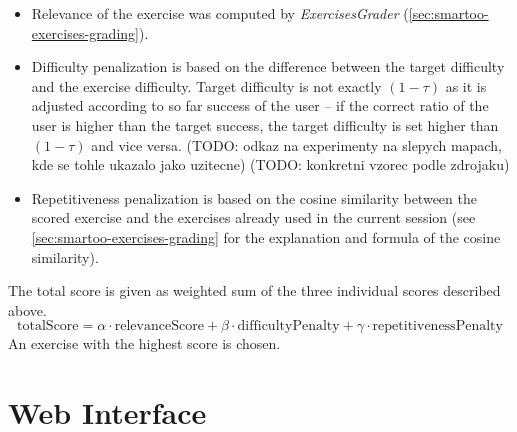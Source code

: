 \documentclass[a4paper, 12pt, twoside]{fithesis2}		%
\renewcommand{\_}{\leavevmode \kern0.07em\vbox{\hrule width0.4em}}
\newcommand{\squarebullet}{\textcolor{black}{\raisebox{0.15em}{\rule{4pt}{4pt}}}}
\newenvironment{myItemize}{
  \begin{itemize}[leftmargin=2em,rightmargin=1em,itemsep=\parskip ,parsep=0em,topsep=0em,partopsep=0em]
  \renewcommand{\labelitemi}{\squarebullet}
  \renewcommand{\labelitemii}{$\diamond$}
}{
  \end{itemize}
}
\begin{document}
\begin{myItemize}
  \item Relevance of the exercise was computed by \textit{ExercisesGrader}
(\autoref{sec:smartoo-exercises-grading}).

  \item Difficulty penalization is based on the difference between the target difficulty and the exercise difficulty.
Target difficulty is not exactly $(1 - \tau)$ as it is adjusted according to
so far success of the user -- if the correct ratio of the user is higher than the target success,
the target difficulty is set higher than $(1 - \tau)$ and vice versa.
(TODO: odkaz na experimenty na slepych mapach, kde se tohle ukazalo jako uzitecne)
(TODO: konkretni vzorec podle zdrojaku)

  \item Repetitiveness penalization is based on the cosine similarity between the scored exercise and the exercises already used in the current session
(see \autoref{sec:smartoo-exercises-grading} for the explanation and formula of the cosine similarity).
\end{myItemize}
The total score is given as weighted sum of the three individual scores described above.
$$
\text{totalScore} = \alpha \cdot \text{relevanceScore} + \beta \cdot \text{difficultyPenalty} + \gamma \cdot \text{repetitivenessPenalty}
$$
An exercise with the highest score is chosen.


\section{Web Interface}
\label{sec:smartoo-web}
\end{document}
